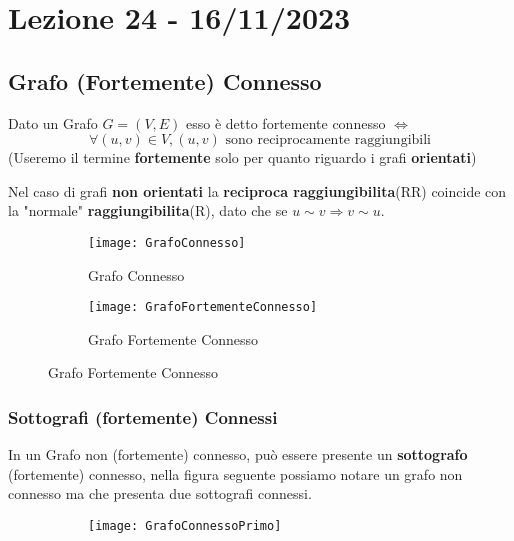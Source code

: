 \section{Lezione 24 - 16/11/2023} 
\subsection{Grafo (Fortemente) Connesso}
Dato un Grafo $G = (V,E)$ esso è detto fortemente connesso $\iff$ 
$$ \forall (u,v) \in V, (u,v) \text{ sono reciprocamente raggiungibili}$$
(Useremo il termine \textbf{fortemente} solo per quanto riguardo i grafi \textbf{orientati})


Nel caso di grafi \textbf{non orientati} la \textbf{reciproca raggiungibilita}(RR) coincide con la "normale" \textbf{raggiungibilita}(R), dato che se $u \sim v \Rightarrow v \sim u $.

\begin{figure}[H]
    \centering
    \begin{subfigure}[b]{0.35\textwidth}
        \texttt{[image: GrafoConnesso]} 
        \caption{Grafo Connesso}
    \end{subfigure}
    \hfill
    \begin{subfigure}[b]{0.35\textwidth}
        \texttt{[image: GrafoFortementeConnesso]} 
        \caption{Grafo Fortemente Connesso}
    \end{subfigure}
\end{figure}

\subsubsection{Sottografi (fortemente) Connessi}
In un Grafo non (fortemente) connesso, può essere presente un \textbf{sottografo} (fortemente) connesso, nella figura seguente possiamo notare un grafo non connesso ma che presenta due sottografi connessi.
\begin{figure}[H]
    \centering
    \begin{subfigure}[b]{0.20\textwidth}
        \texttt{[image: GrafoConnessoPrimo]} 
    \end{subfigure}
\end{figure}

